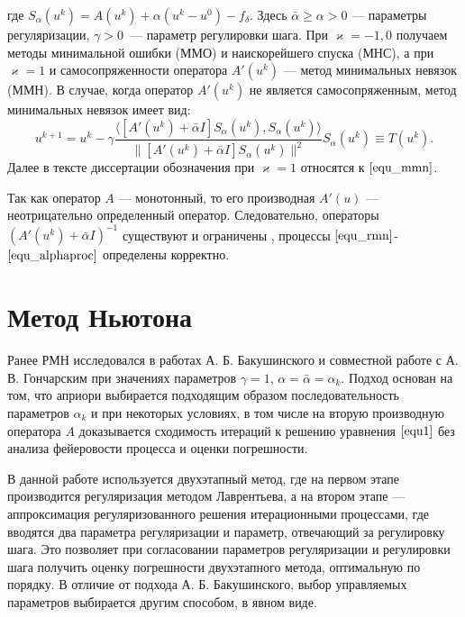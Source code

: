 где $S_\alpha(u^k)=A(u^k)+\alpha(u^k-u^0)-f_\delta$. Здесь $\bar\alpha \ge \alpha >0$ --- параметры регуляризации, $\gamma>0$~--- параметр регулировки шага. При $\varkappa=-1,0$ получаем методы минимальной ошибки (ММО) и наискорейшего спуска (МНС), а при $\varkappa=1$ и самосопряженности оператора $A'(u^k)$ --- метод минимальных невязок (ММН).    
В случае, когда оператор $A'(u^k)$ не является самосопряженным, метод минимальных невязок имеет вид:
\begin{equation}\label{equ_mmn}
u^{k+1} =u^k - \gamma\frac{\langle [A'(u^k)+\bar{\alpha}I]S_\alpha(u^k), S_\alpha (u^k)\rangle}{\|[A'(u^k)+\bar{\alpha}I]S_\alpha(u^k)\|^2}S_\alpha (u^k)\equiv{T(u^k)}.
\end{equation}
Далее в тексте диссертации обозначения при $\varkappa=1$ относятся к $\eqref{equ_mmn}$.

Так как оператор $A$ --- монотонный, то его производная $A'(u)$ --- неотрицательно определенный оператор. Следовательно, операторы $(A'(u^k)+\bar\alpha I)^{-1}$ существуют и ограничены \cite{Bak1976}, процессы $\eqref{equ_rmn}$-$\eqref{equ_alphaproc}$ определены корректно.

\newpage
\section{Метод Ньютона}
Ранее РМН исследовался в работах А. Б. Бакушинского \cite{Bak1976,Bak1992} и совместной работе с А. В. Гончарским \cite{BakGon1989} при значениях параметров $\gamma=1$, $\alpha=\bar{\alpha}=\alpha_k$. Подход основан на том, что априори выбирается подходящим образом последовательность параметров $\alpha_k$ и при некоторых условиях, в том числе на вторую производную оператора $A$ доказывается сходимость итераций к решению уравнения $\eqref{equ1}$ без анализа фейеровости процесса и оценки погрешности. 

В данной работе используется двухэтапный метод, где на первом этапе производится регуляризация методом Лаврентьева, а на втором этапе --- аппроксимация регуляризованного решения итерационными процессами, где вводятся два параметра регуляризации и параметр, отвечающий за регулировку шага. Это позволяет при согласовании параметров регуляризации и регулировки шага получить оценку погрешности двухэтапного метода, оптимальную по порядку. В отличие от подхода А. Б. Бакушинского, выбор управляемых параметров выбирается другим способом, в явном виде. 

